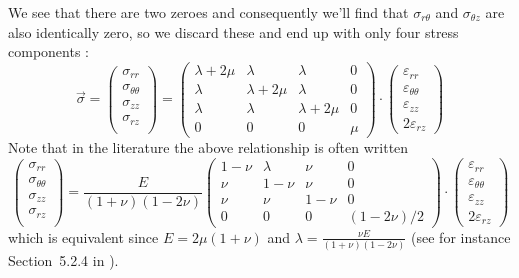 We see that there are two zeroes and consequently we'll find that $\sigma_{r\theta}$ and $\sigma_{\theta z}$ are also
identically zero, so we discard these and end up with only four stress components :
\[
\vec{\sigma}=
\left(
\begin{array}{c}
\sigma_{rr} \\
\sigma_{\theta\theta} \\
\sigma_{zz} \\
\sigma_{rz} \\
\end{array}
\right)
=
\left(
\begin{array}{cccc}
\lambda+2\mu & \lambda & \lambda & 0  \\
\lambda & \lambda+2\mu & \lambda & 0  \\
\lambda & \lambda & \lambda+2\mu & 0  \\
0 & 0 & 0 & \mu 
\end{array}
\right)
\cdot
\left(
\begin{array}{c}
\varepsilon_{rr} \\
\varepsilon_{\theta\theta} \\
\varepsilon_{zz} \\
2\varepsilon_{rz} 
\end{array}
\right)
\]
Note that in the literature the above relationship is often written 
\[
\left(
\begin{array}{c}
\sigma_{rr} \\
\sigma_{\theta\theta} \\
\sigma_{zz} \\
\sigma_{rz} \\
\end{array}
\right)
=
\frac{E}{(1+\nu)(1-2\nu)}
\left(
\begin{array}{cccc}
1-\nu & \lambda & \nu & 0  \\
\nu & 1-\nu & \nu & 0  \\
\nu & \nu & 1-\nu & 0  \\
0 & 0 & 0 & (1-2\nu)/2
\end{array}
\right)
\cdot
\left(
\begin{array}{c}
\varepsilon_{rr} \\
\varepsilon_{\theta\theta} \\
\varepsilon_{zz} \\
2\varepsilon_{rz} 
\end{array}
\right)
\]
which is equivalent since $E=2\mu(1+\nu)$ and $\lambda=\frac{\nu E}{(1+\nu)(1-2\nu)}$ (see for instance Section~5.2.4 in \cite{zita1}).   

